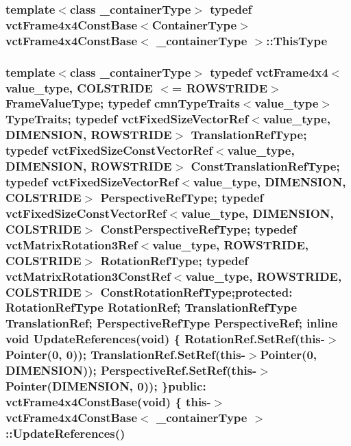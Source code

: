 \hypertarget{classvct_frame4x4_const_base_acb37107e49c20bd15139ff196aff1087}{
\subsubsection[{This\-Type}]{\setlength{\rightskip}{0pt plus 5cm}template$<$class \-\_\-container\-Type$>$ typedef {\bf vct\-Frame4x4\-Const\-Base}$<${\bf Container\-Type}$>$ {\bf vct\-Frame4x4\-Const\-Base}$<$ \-\_\-container\-Type $>$\-::{\bf This\-Type}}}\label{classvct_frame4x4_const_base_acb37107e49c20bd15139ff196aff1087}
\hypertarget{classvct_frame4x4_const_base_aabe7499444284102317fe1af3a3f6978}{
\subsubsection[{Update\-References}]{\setlength{\rightskip}{0pt plus 5cm}template$<$class \-\_\-container\-Type$>$ typedef {\bf vct\-Frame4x4}$<$value\-\_\-type, {\bf C\-O\-L\-S\-T\-R\-I\-D\-E} $<$= {\bf R\-O\-W\-S\-T\-R\-I\-D\-E}$>$ Frame\-Value\-Type; typedef {\bf cmn\-Type\-Traits}$<$value\-\_\-type$>$ Type\-Traits; typedef {\bf vct\-Fixed\-Size\-Vector\-Ref}$<$value\-\_\-type, {\bf D\-I\-M\-E\-N\-S\-I\-O\-N}, {\bf R\-O\-W\-S\-T\-R\-I\-D\-E}$>$ Translation\-Ref\-Type; typedef {\bf vct\-Fixed\-Size\-Const\-Vector\-Ref}$<$value\-\_\-type, {\bf D\-I\-M\-E\-N\-S\-I\-O\-N}, {\bf R\-O\-W\-S\-T\-R\-I\-D\-E}$>$ Const\-Translation\-Ref\-Type; typedef {\bf vct\-Fixed\-Size\-Vector\-Ref}$<$value\-\_\-type, {\bf D\-I\-M\-E\-N\-S\-I\-O\-N}, {\bf C\-O\-L\-S\-T\-R\-I\-D\-E}$>$ Perspective\-Ref\-Type; typedef {\bf vct\-Fixed\-Size\-Const\-Vector\-Ref}$<$value\-\_\-type, {\bf D\-I\-M\-E\-N\-S\-I\-O\-N}, {\bf C\-O\-L\-S\-T\-R\-I\-D\-E}$>$ Const\-Perspective\-Ref\-Type; typedef {\bf vct\-Matrix\-Rotation3\-Ref}$<$value\-\_\-type, {\bf R\-O\-W\-S\-T\-R\-I\-D\-E}, {\bf C\-O\-L\-S\-T\-R\-I\-D\-E}$>$ Rotation\-Ref\-Type; typedef {\bf vct\-Matrix\-Rotation3\-Const\-Ref}$<$value\-\_\-type, {\bf R\-O\-W\-S\-T\-R\-I\-D\-E}, {\bf C\-O\-L\-S\-T\-R\-I\-D\-E}$>$ Const\-Rotation\-Ref\-Type;protected\-: Rotation\-Ref\-Type Rotation\-Ref; Translation\-Ref\-Type Translation\-Ref; Perspective\-Ref\-Type Perspective\-Ref; inline void Update\-References(void) \{ Rotation\-Ref.\-Set\-Ref(this-\/$>$Pointer(0, 0)); Translation\-Ref.\-Set\-Ref(this-\/$>$Pointer(0, {\bf D\-I\-M\-E\-N\-S\-I\-O\-N})); Perspective\-Ref.\-Set\-Ref(this-\/$>$Pointer({\bf D\-I\-M\-E\-N\-S\-I\-O\-N}, 0)); \}public\-: {\bf vct\-Frame4x4\-Const\-Base}(void) \{ this-\/$>$ {\bf vct\-Frame4x4\-Const\-Base}$<$ \-\_\-container\-Type $>$\-::Update\-References()}}\label{classvct_frame4x4_const_base_aabe7499444284102317fe1af3a3f6978}


